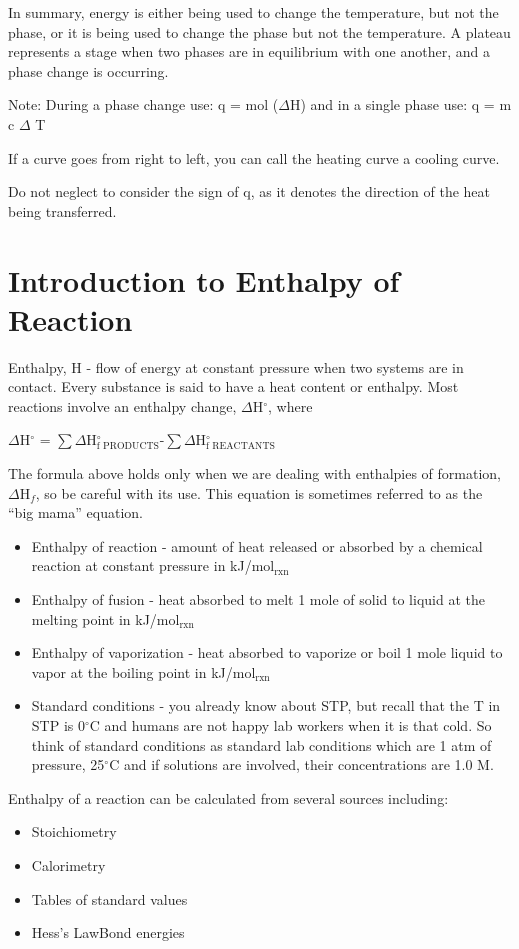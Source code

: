 \documentclass[../chem.tex]{subfiles}
\begin{document}
In summary, energy is either being used to change the temperature, but not the phase, or it is being used to change the phase but not the temperature. A plateau represents a stage when two phases are in equilibrium with one another, and a phase change is occurring.

Note: During a phase change use: q = mol ($\Delta$H) and in a single phase use: q = m c $\Delta$ T

If a curve goes from right to left, you can call the heating curve a cooling curve.

Do not neglect to consider the sign of q, as it denotes the direction of the heat being transferred.
\section{Introduction to Enthalpy of Reaction}
Enthalpy, H - flow of energy at constant pressure when two systems are in contact. Every substance is said to have a heat content or enthalpy. Most reactions involve an enthalpy change, $\Delta$H$^{\circ}$, where 
\begin{center}
    $\Delta$H$^{\circ}$ = $\sum\Delta$H$^{\circ}_{\text{f PRODUCTS}}$-$\sum\Delta$H$^{\circ}_{\text{f REACTANTS}}$
\end{center}

The formula above holds only when we are dealing with enthalpies of formation, $\Delta$H$_f$, so be careful with its use. This equation is sometimes referred to as the ``big mama'' equation.
\begin{itemize}
    \item Enthalpy of reaction - amount of heat released or absorbed by a chemical reaction at constant pressure in kJ/mol$_{\text{rxn}}$
    \item Enthalpy of fusion - heat absorbed to melt 1 mole of solid to liquid at the melting point in kJ/mol$_{\text{rxn}}$
    \item Enthalpy of vaporization - heat absorbed to vaporize or boil 1 mole liquid to vapor at the boiling point in kJ/mol$_{\text{rxn}}$
    \item Standard conditions - you already know about STP, but recall that the T in STP is 0$^{\circ}$C and humans are not happy lab workers when it is that cold. So think of standard conditions as standard lab conditions which are 1 atm of pressure, 25$^{\circ}$C and if solutions are involved, their concentrations are 1.0 M.
\end{itemize}

Enthalpy of a reaction can be calculated from several sources including:
\begin{itemize}
    \item Stoichiometry
    \item Calorimetry
    \item Tables of standard values 
    \item Hess's LawBond energies
\end{itemize}
\end{document}
